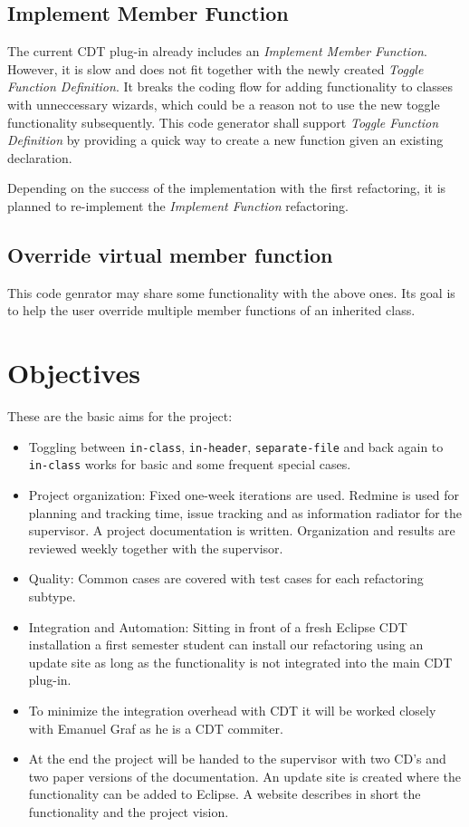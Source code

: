 \subsection{Implement Member Function}
The current CDT plug-in already includes an \textit{Implement Member Function}.
However, it is slow and does not fit together with the newly created 
\textit{Toggle Function Definition}. It breaks the coding flow for adding 
functionality to classes with unneccessary wizards, which could be a reason not 
to use the new toggle functionality subsequently. This code generator shall 
support \textit{Toggle Function Definition} by providing a quick way to create a 
new function given an existing declaration.

Depending on the success of the implementation with the first refactoring, it is 
planned to re-implement the \textit{Implement Function} refactoring.

\subsection{Override virtual member function}
This code genrator may share some functionality with the above ones. Its goal is 
to help the user override multiple member functions of an inherited class.

\section{Objectives}

These are the basic aims for the project:
\begin{itemize}
 \item Toggling between \texttt{in-class}, \texttt{in-header},
\texttt{separate-file} and back again to \texttt{in-class} works for basic and
some frequent special cases.
 \item Project organization: Fixed one-week iterations are used. Redmine is used
for planning and tracking time, issue tracking and as information radiator for
the supervisor. A project documentation is written. Organization and results are
reviewed weekly together with the supervisor.
 \item Quality: Common cases are covered with test cases for each
refactoring subtype.
 \item Integration and Automation: Sitting in front of a fresh Eclipse CDT
installation a first semester student can install our refactoring using an
update site as long as the functionality is not integrated into the main CDT
plug-in.
 \item To minimize the integration overhead with CDT it will be worked closely
with Emanuel Graf as he is a CDT commiter.
 \item At the end the project will be handed to the supervisor with two CD's and
two paper versions of the documentation. An update site is created where the
functionality can be added to Eclipse. A website describes in short the
functionality and the project vision.
\end{itemize}

